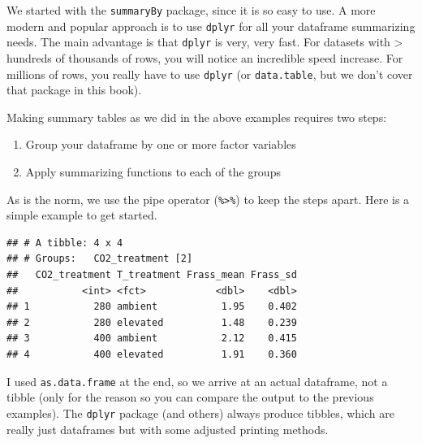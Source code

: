 \documentclass[]{book}
\newenvironment{Shaded}{\begin{snugshade}}{\end{snugshade}}
\newcommand{\DataTypeTok}[1]{\textcolor[rgb]{0.13,0.29,0.53}{#1}}
\newcommand{\KeywordTok}[1]{\textcolor[rgb]{0.13,0.29,0.53}{\textbf{#1}}}
\newcommand{\NormalTok}[1]{#1}
\newcommand{\OperatorTok}[1]{\textcolor[rgb]{0.81,0.36,0.00}{\textbf{#1}}}
\newcommand{\OtherTok}[1]{\textcolor[rgb]{0.56,0.35,0.01}{#1}}
\newcommand{\StringTok}[1]{\textcolor[rgb]{0.31,0.60,0.02}{#1}}
\providecommand{\tightlist}{%
  \setlength{\itemsep}{0pt}\setlength{\parskip}{0pt}}
\begin{document}
We started with the \texttt{summaryBy} package, since it is so easy to use. A more modern and popular approach is to use \texttt{dplyr} for all your dataframe summarizing needs. The main advantage is that \texttt{dplyr} is very, very fast. For datasets with \textgreater{} hundreds of thousands of rows, you will notice an incredible speed increase. For millions of rows, you really have to use \texttt{dplyr} (or \texttt{data.table}, but we don't cover that package in this book).

Making summary tables as we did in the above examples requires two steps:

\begin{enumerate}
\def\labelenumi{\arabic{enumi}.}
\tightlist
\item
  Group your dataframe by one or more factor variables
\item
  Apply summarizing functions to each of the groups
\end{enumerate}

As is the norm, we use the pipe operator (\texttt{\%\textgreater{}\%}) to keep the steps apart. Here is a simple example to get started.

\begin{Shaded}
\end{Shaded}

\begin{verbatim}
## # A tibble: 4 x 4
## # Groups:   CO2_treatment [2]
##   CO2_treatment T_treatment Frass_mean Frass_sd
##           <int> <fct>            <dbl>    <dbl>
## 1           280 ambient           1.95    0.402
## 2           280 elevated          1.48    0.239
## 3           400 ambient           2.12    0.415
## 4           400 elevated          1.91    0.360
\end{verbatim}

I used \texttt{as.data.frame} at the end, so we arrive at an actual dataframe, not a tibble (only for the reason so you can compare the output to the previous examples). The \texttt{dplyr} package (and others) always produce tibbles, which are really just dataframes but with some adjusted printing methods.
\end{document}
